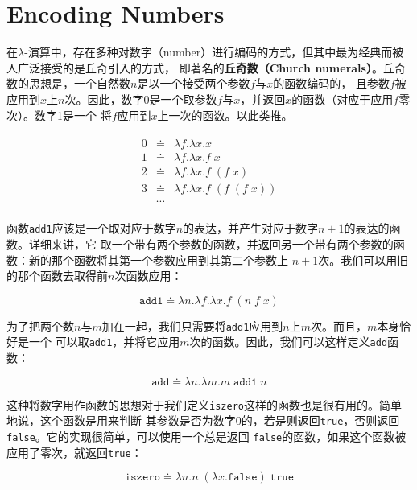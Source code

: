 \documentclass[12pt]{article}
\begin{document}
\section{Encoding Numbers}
\indent{}在$\lambda$-演算中，存在多种对数字（number）进行编码的方式，但其中最为经典而被人广泛接受的是丘奇引入的方式，
即著名的\textbf{丘奇数（Church numerals）}。丘奇数的思想是，一个自然数$n$是以一个接受两个参数$f$与$x$的函数编码的，
且参数$f$被应用到$x$上$n$次。因此，数字0是一个取参数$f$与$x$，并返回$x$的函数（对应于应用$f$零次）。数字1是一个
将$f$应用到$x$上一次的函数。以此类推。
\begin{tcolorbox}[top=-0.8em,left=0mm,right=0mm,bottom=0mm]
\begin{gather*}
\begin{array}{lcl}
0 & \doteq & \lambda{}f.\lambda{}x.x\\
1 & \doteq & \lambda{}f.\lambda{}x.f\;x\\
2 & \doteq & \lambda{}f.\lambda{}x.f\;(f\;x)\\
3 & \doteq & \lambda{}f.\lambda{}x.f\;(f\;(f\;x))\\
  & \cdots &
\end{array}
\end{gather*}
\end{tcolorbox}

\indent{}函数\texttt{add1}应该是一个取对应于数字$n$的表达，并产生对应于数字$n+1$的表达的函数。详细来讲，它
取一个带有两个参数的函数，并返回另一个带有两个参数的函数：新的那个函数将其第一个参数应用到其第二个参数上
$n+1$次。我们可以用旧的那个函数去取得前$n$次函数应用：
\begin{tcolorbox}[top=-0.4em,left=0mm,right=0mm,bottom=1mm]
\begin{displaymath}
\texttt{add1} \doteq \lambda{}n.\lambda{}f.\lambda{}x.f\;(n\;f\;x)
\end{displaymath}
\end{tcolorbox}

\indent{}为了把两个数$n$与$m$加在一起，我们只需要将\texttt{add1}应用到$n$上$m$次。而且，$m$本身恰好是一个
可以取\texttt{add1}，并将它应用$m$次的函数。因此，我们可以这样定义\texttt{add}函数：
\begin{tcolorbox}[top=-0.4em,left=0mm,right=0mm,bottom=2mm]
\begin{displaymath}
\texttt{add} \doteq \lambda{}n.\lambda{}m.m\;\texttt{add1}\;n
\end{displaymath}
\end{tcolorbox}

\indent{}这种将数字用作函数的思想对于我们定义\texttt{iszero}这样的函数也是很有用的。简单地说，这个函数是用来判断
其参数是否为数字0的，若是则返回\texttt{true}，否则返回\texttt{false}。它的实现很简单，可以使用一个总是返回
\texttt{false}的函数，如果这个函数被应用了零次，就返回\texttt{true}：
\begin{tcolorbox}[top=-0.4em,left=0mm,right=0mm,bottom=1mm]
\begin{displaymath}
\texttt{iszero} \doteq \lambda{}n.n\;(\lambda{}x.\texttt{false})\;\texttt{true}
\end{displaymath}
\end{tcolorbox}
\end{document}
